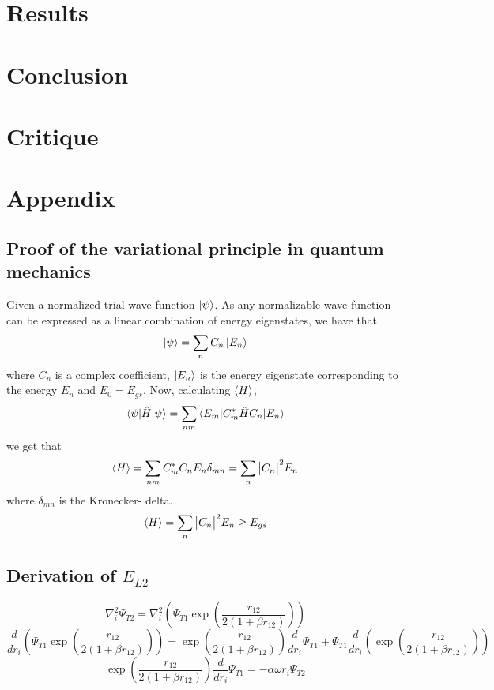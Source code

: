 \documentclass[10pt,a4paper]{article}
\begin{document}
\section{Results}

\section{Conclusion}

\section{Critique}

\section{Appendix}
\subsection{Proof of the variational principle in quantum mechanics}\label{Proof_variational_principle}
Given a normalized trial wave function $\ket{\psi}$. As any normalizable wave function can be expressed as a linear combination of energy eigenstates, we have that
$$
\ket{\psi} = \sum\limits_n C_n \ket{E_n}
$$
where $C_n$ is a complex coefficient, $\ket{E_n}$ is the energy eigenstate corresponding to the energy $E_n$ and $E_0=E_{gs}$. Now, calculating $\braket{H}$, 
$$
\braket{\psi|\hat{H}|\psi} = \sum\limits_{nm} \braket{E_m|C_m^*\hat{H}C_n|E_n}
$$
we get that 
$$
\braket{H}= \sum\limits_{nm} C_m^*C_n E_n \delta_{mn} =\sum\limits_{n} \big|  C_n \big|^2E_n
$$
where $\delta_{mn}$ is the Kronecker- delta.
\begin{equation}
\braket{H}=\sum\limits_{n} \big|  C_n \big|^2E_n \geq E_{gs}
\end{equation}
\subsection{Derivation of $E_{L2}$}
\begin{equation}
\nabla_i^2\Psi_{T2} = \nabla_i^2\left( \Psi_{T1}\exp{\left(\frac{r_{12}}{2(1+\beta r_{12})}\right)} \right)
\end{equation}
\[
\frac{d}{dr_i}\left(  \Psi_{T1}\exp{\left(\frac{r_{12}}{2(1+\beta r_{12})}\right)} \right) = \exp{\left(\frac{r_{12}}{2(1+\beta r_{12})}\right)}\frac{d}{dr_i}\Psi_{T1} + \Psi_{T1}\frac{d}{dr_i}\left( \exp{\left(\frac{r_{12}}{2(1+\beta r_{12})}\right)}\right)
\]
\begin{equation*}
\exp{\left(\frac{r_{12}}{2(1+\beta r_{12})}\right)}\frac{d}{dr_i}\Psi_{T1} = -\alpha \omega r_i\Psi_{T2}
\end{equation*}
\end{document}
